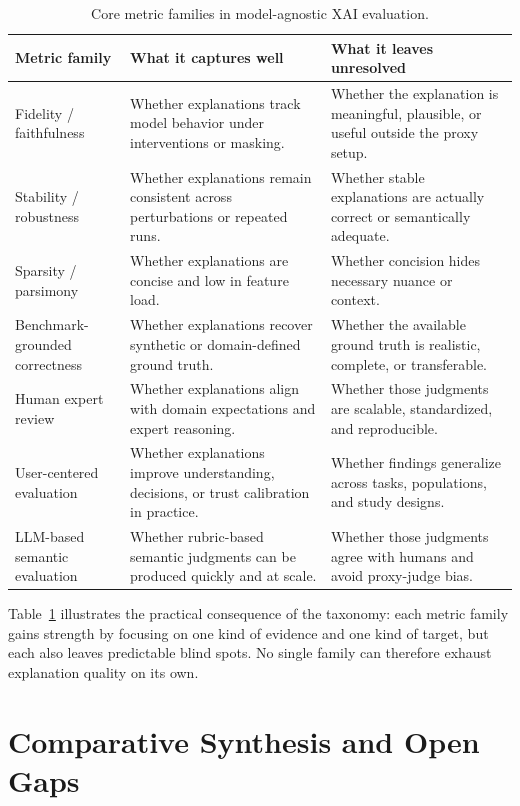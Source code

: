 \documentclass[twoside,11pt]{article}
\begin{document}
\begin{table}[t]
\centering
\caption{Core metric families in model-agnostic XAI evaluation.}
\footnotesize
\begin{tabularx}{\linewidth}{l X X}
\toprule
\textbf{Metric family} & \textbf{What it captures well} & \textbf{What it leaves unresolved} \\
\midrule
Fidelity / faithfulness & Whether explanations track model behavior under interventions or masking. & Whether the explanation is meaningful, plausible, or useful outside the proxy setup. \\
Stability / robustness & Whether explanations remain consistent across perturbations or repeated runs. & Whether stable explanations are actually correct or semantically adequate. \\
Sparsity / parsimony & Whether explanations are concise and low in feature load. & Whether concision hides necessary nuance or context. \\
Benchmark-grounded correctness & Whether explanations recover synthetic or domain-defined ground truth. & Whether the available ground truth is realistic, complete, or transferable. \\
Human expert review & Whether explanations align with domain expectations and expert reasoning. & Whether those judgments are scalable, standardized, and reproducible. \\
User-centered evaluation & Whether explanations improve understanding, decisions, or trust calibration in practice. & Whether findings generalize across tasks, populations, and study designs. \\
LLM-based semantic evaluation & Whether rubric-based semantic judgments can be produced quickly and at scale. & Whether those judgments agree with humans and avoid proxy-judge bias. \\
\bottomrule
\end{tabularx}
\label{tab:taxonomy}
\end{table}

Table~\ref{tab:taxonomy} illustrates the practical consequence of the
taxonomy: each metric family gains strength by focusing on one kind of
evidence and one kind of target, but each also leaves predictable blind
spots. No single family can therefore exhaust explanation quality on its
own.

\section{Comparative Synthesis and Open Gaps}
\end{document}
